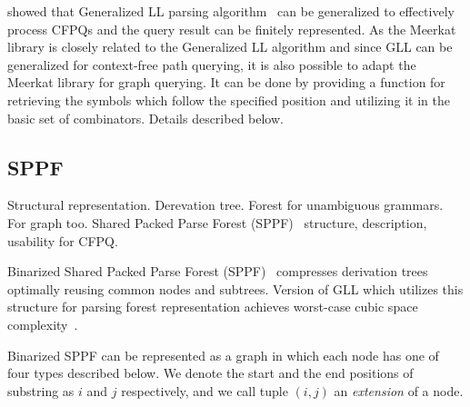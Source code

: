 \cite{GrigorevR16} showed that Generalized LL parsing algorithm~\cite{scott2010gll} can be generalized to effectively process CFPQs and the query result can be finitely represented.
As the Meerkat library is closely related to the Generalized LL algorithm and since GLL can be generalized for context-free path querying, it is also possible to adapt the Meerkat library for graph querying. 
It can be done by providing a function for retrieving the symbols which follow the specified position and utilizing it in the basic set of combinators.
Details described below.





\subsection{SPPF}

Structural representation. 
Derevation tree.
Forest for unambiguous grammars.
For graph too.
Shared Packed Parse Forest (SPPF)~\cite{SPPF} structure, description, usability for CFPQ.

Binarized Shared Packed Parse Forest (SPPF)~\cite{brnglr} compresses derivation trees optimally reusing common nodes and subtrees.
Version of GLL which utilizes this structure for parsing forest representation achieves worst-case cubic space complexity~\cite{gllParsingTree}.

Binarized SPPF can be represented as a graph in which each node has one of four types described below.
We denote the start and the end positions of substring as $i$ and $j$ respectively, and we call tuple $(i,j)$ an \textit{extension} of a node.

